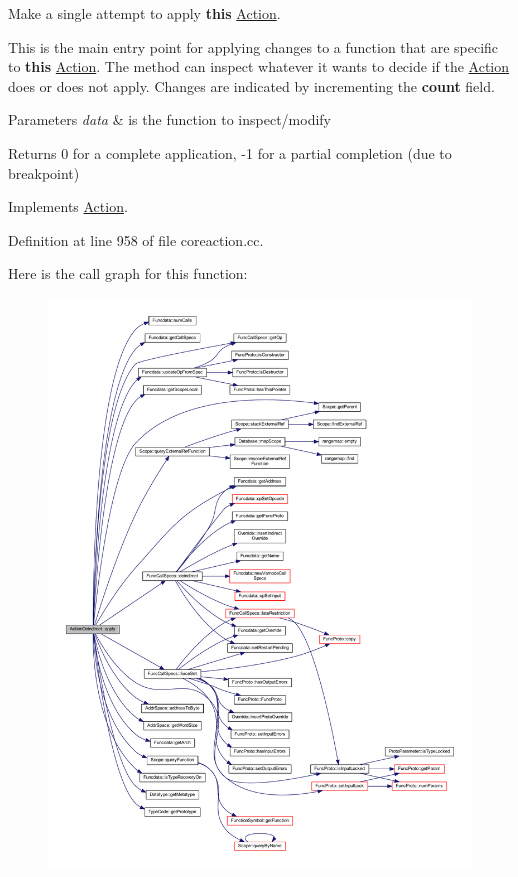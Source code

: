 Make a single attempt to apply {\bfseries{this}} \mbox{\hyperlink{class_action}{Action}}. 

This is the main entry point for applying changes to a function that are specific to {\bfseries{this}} \mbox{\hyperlink{class_action}{Action}}. The method can inspect whatever it wants to decide if the \mbox{\hyperlink{class_action}{Action}} does or does not apply. Changes are indicated by incrementing the {\bfseries{count}} field. 
\begin{DoxyParams}{Parameters}
{\em data} & is the function to inspect/modify \\
\hline
\end{DoxyParams}
\begin{DoxyReturn}{Returns}
0 for a complete application, -\/1 for a partial completion (due to breakpoint) 
\end{DoxyReturn}


Implements \mbox{\hyperlink{class_action_aac1c3999d6c685b15f5d9765a4d04173}{Action}}.



Definition at line 958 of file coreaction.\+cc.

Here is the call graph for this function\+:
\nopagebreak
\begin{figure}[H]
\begin{center}
\leavevmode
\includegraphics[width=350pt]{class_action_deindirect_a4f54f89989ab5700bdac440960ed6fcf_cgraph}
\end{center}
\end{figure}
\mbox{\label{class_action_deindirect_ae0d7981c40e1af3c554a2229dc8c44ab}} 

